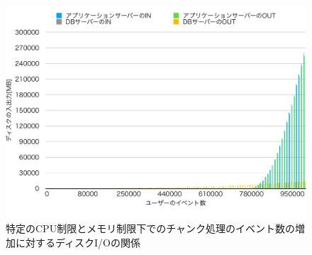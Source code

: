 \documentclass[../../../../../../main]{subfiles}
\begin{document}
    \begin{figure}[H]
        \centering
        \includegraphics[width=12cm]{graph}
        \caption{特定のCPU制限とメモリ制限下でのチャンク処理のイベント数の増加に対するディスクI/Oの関係}
        \label{fig:stream-disio-app_1_1024-db_1_1024}
    \end{figure}
\end{document}
